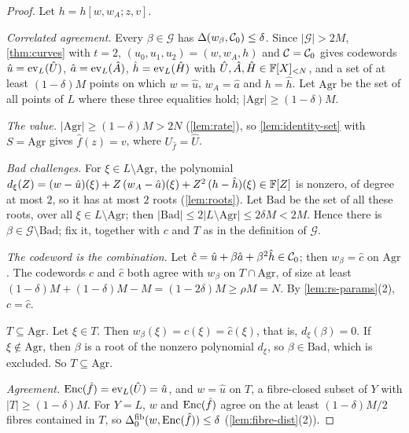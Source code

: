 \begin{proof}
Let $h = h[w,w_A;z,v]$.

\emph{Correlated agreement.}
Every $\beta \in \mathcal{G}$ has $\Delta(w_\beta, \mathcal{C}_0) \le \delta$. Since $|\mathcal{G}| > 2M$, \cref{thm:curves} with $t = 2$, $(u_0,u_1,u_2) = (w, w_A, h)$ and $\mathcal{C} = \mathcal{C}_0$ gives codewords $\hat u = \mathrm{ev}_L(\hat U)$, $\hat a = \mathrm{ev}_L(\hat A)$, $\hat h = \mathrm{ev}_L(\hat H)$ with $\hat U, \hat A, \hat H \in \mathbb{F}[X]_{<N}$, and a set of at least $(1-\delta)M$ points on which $w = \hat u$, $w_A = \hat a$ and $h = \hat h$.
Let $\mathrm{Agr}$ be the set of all points of $L$ where these three equalities hold; $|\mathrm{Agr}| \ge (1-\delta)M$.

\emph{The value.}
$|\mathrm{Agr}| \ge (1-\delta)M > 2N$ (\cref{lem:rate}), so \cref{lem:identity-set} with $S = \mathrm{Agr}$ gives $\hat f(z) = v$, where $U_{\hat f} = \hat U$.

\emph{Bad challenges.}
For $\xi \in L \setminus \mathrm{Agr}$, the polynomial $d_\xi(Z) = (w - \hat u)(\xi) + Z\,(w_A - \hat a)(\xi) + Z^2\,(h - \hat h)(\xi) \in \mathbb{F}[Z]$ is nonzero, of degree at most $2$, so it has at most $2$ roots (\cref{lem:roots}).
Let $\mathrm{Bad}$ be the set of all these roots, over all $\xi \in L \setminus \mathrm{Agr}$; then $|\mathrm{Bad}| \le 2|L \setminus \mathrm{Agr}| \le 2\delta M < 2M$.
Hence there is $\beta \in \mathcal{G} \setminus \mathrm{Bad}$; fix it, together with $c$ and $T$ as in the definition of $\mathcal{G}$.

\emph{The codeword is the combination.}
Let $\hat c = \hat u + \beta \hat a + \beta^2 \hat h \in \mathcal{C}_0$; then $w_\beta = \hat c$ on $\mathrm{Agr}$.
The codewords $c$ and $\hat c$ both agree with $w_\beta$ on $T \cap \mathrm{Agr}$, of size at least $(1-\delta)M + (1-\delta)M - M = (1-2\delta)M \ge \rho M = N$. By \cref{lem:rs-params}(2), $c = \hat c$.

\emph{$T \subseteq \mathrm{Agr}$.}
Let $\xi \in T$. Then $w_\beta(\xi) = c(\xi) = \hat c(\xi)$, that is, $d_\xi(\beta) = 0$. If $\xi \notin \mathrm{Agr}$, then $\beta$ is a root of the nonzero polynomial $d_\xi$, so $\beta \in \mathrm{Bad}$, which is excluded. So $T \subseteq \mathrm{Agr}$.

\emph{Agreement.}
$\mathrm{Enc}(\hat f) = \mathrm{ev}_L(\hat U) = \hat u$, and $w = \hat u$ on $T$, a fibre-closed subset of $Y$ with $|T| \ge (1-\delta)M$.
For $Y = L$, $w$ and $\mathrm{Enc}(\hat f)$ agree on the at least $(1-\delta)M/2$ fibres contained in $T$, so $\Delta^{\mathrm{fib}}_0(w, \mathrm{Enc}(\hat f)) \le \delta$ (\cref{lem:fibre-dist}(2)).
\end{proof}

